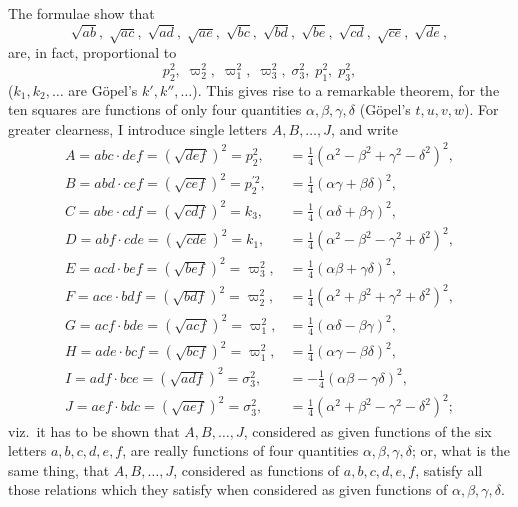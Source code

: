 \documentclass[11pt,a4paper]{article}
\begin{document}
The formulae show that
\[
\sqrt{ab},\;\sqrt{ac},\;\sqrt{ad},\;\sqrt{ae},\;\sqrt{bc},\;\sqrt{bd},\;\sqrt{be},\;\sqrt{cd},\;\sqrt{ce},\;\sqrt{de},
\]
are, in fact, proportional to
\[
p_{2}^{2},\;\varpi_{2}^{2},\;\varpi_{1}^{2},\;\varpi_{3}^{2},\;\sigma_{3}^{2},\;p_{1}^{2},\;p_{3}^{2},
\]
($k_{1}, k_{2}, \ldots$ are G\"opel's $k', k'', \ldots$). This gives rise to a remarkable theorem, for the ten squares are functions of only four quantities $\alpha, \beta, \gamma, \delta$ (G\"opel's $t, u, v, w$). For greater clearness, I introduce single letters $A, B, \ldots, J$, and write
\[
\begin{array}{ll}
A = abc \cdot def = (\sqrt{def})^{2} = p_{2}^{2}, & = \tfrac{1}{4}(\alpha^{2} - \beta^{2} + \gamma^{2} - \delta^{2})^{2},\\
B = abd \cdot cef = (\sqrt{cef})^{2} = p_{2}^{\prime 2}, & = \tfrac{1}{4}(\alpha\gamma + \beta\delta)^{2},\\
C = abe \cdot cdf = (\sqrt{cdf})^{2} = k_{3}, & = \tfrac{1}{4}(\alpha\delta + \beta\gamma)^{2},\\
D = abf \cdot cde = (\sqrt{cde})^{2} = k_{1}, & = \tfrac{1}{4}(\alpha^{2} - \beta^{2} - \gamma^{2} + \delta^{2})^{2},\\
E = acd \cdot bef = (\sqrt{bef})^{2} = \varpi_{3}^{2}, & = \tfrac{1}{4}(\alpha\beta + \gamma\delta)^{2},\\
F = ace \cdot bdf = (\sqrt{bdf})^{2} = \varpi_{2}^{2}, & = \tfrac{1}{4}(\alpha^{2} + \beta^{2} + \gamma^{2} + \delta^{2})^{2},\\
G = acf \cdot bde = (\sqrt{acf})^{2} = \varpi_{1}^{2}, & = \tfrac{1}{4}(\alpha\delta - \beta\gamma)^{2},\\
H = ade \cdot bcf = (\sqrt{bcf})^{2} = \varpi_{1}^{2}, & = \tfrac{1}{4}(\alpha\gamma - \beta\delta)^{2},\\
I = adf \cdot bce = (\sqrt{adf})^{2} = \sigma_{3}^{2}, & = -\tfrac{1}{4}(\alpha\beta - \gamma\delta)^{2},\\
J = aef \cdot bdc = (\sqrt{aef})^{2} = \sigma_{3}^{2}, & = \tfrac{1}{4}(\alpha^{2} + \beta^{2} - \gamma^{2} - \delta^{2})^{2};
\end{array}
\]
viz.\ it has to be shown that $A, B, \ldots, J$, considered as given functions of the six letters $a, b, c, d, e, f$, are really functions of four quantities $\alpha, \beta, \gamma, \delta$; or, what is the same thing, that $A, B, \ldots, J$, considered as functions of $a, b, c, d, e, f$, satisfy all those relations which they satisfy when considered as given functions of $\alpha, \beta, \gamma, \delta$.
\end{document}
